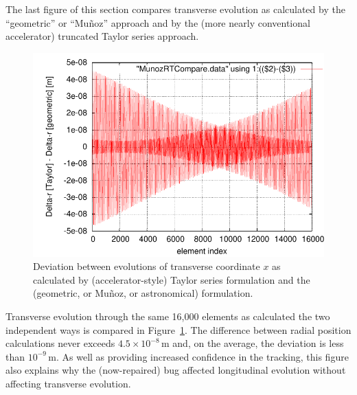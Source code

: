 \documentclass[]{article}
\begin{document}
The last figure of this section compares transverse evolution
as calculated by the ``geometric'' or ``Mu\~noz'' approach and
by the (more nearly conventional accelerator) truncated Taylor series
approach. 
%
\begin{figure}[h]
\centering
\includegraphics[scale=0.8]{pdf/MunozRT-compare-eps-converted-to.pdf}

\caption{\label{fig:MunozRT-compare}Deviation between evolutions of
transverse coordinate $x$ as calculated by (accelerator-style) 
Taylor series formulation and the (geometric, or Mu\~noz, or 
astronomical) formulation.}
\end{figure}
%
Transverse evolution through the same 16,000 elements as
calculated the two independent ways is compared in 
Figure~\ref{fig:MunozRT-compare}. The difference between
radial position calculations never exceeds 
$4.5\times10^{-8}\,$m and, on the average, the deviation
is less than $10^{-9}\,$m. As well as providing
increased confidence in the tracking, this figure also explains
why the (now-repaired) bug affected longitudinal evolution
without affecting transverse evolution.
\end{document}
